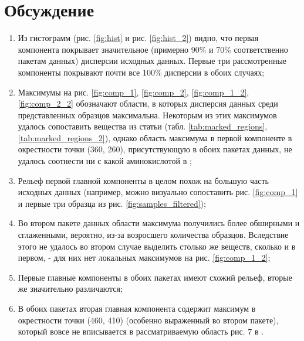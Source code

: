 \documentclass[a4paper]{article}
\begin{document}
\section{Обсуждение}
\begin{enumerate}
    \item Из гистограмм (рис. \ref{fig:hist} и рис. \ref{fig:hist_2}) видно, что первая компонента покрывает значительное (примерно 90\% и 70\% соответственно пакетам данных) дисперсии исходных данных. Первые три рассмотренные компоненты покрывают почти все 100\% дисперсии в обоих случаях;
    \item Максимумы на рис. \ref{fig:comp_1}, \ref{fig:comp_2}, \ref{fig:comp_1_2}, \ref{fig:comp_2_2} обозначают области, в которых дисперсия данных среди  представленных образцов максимальна. Некоторым из этих максимумов удалось сопоставить вещества  из статьи \cite{article1} (табл. \ref{tab:marked_regions}, \ref{tab:marked_regions_2}), однако область максимума в первой компоненте в окрестности точки (360, 260), присутствующую в обоих пакетах данных, не удалось соотнести ни с какой аминокислотой в \cite{article1};
    \item Рельеф первой главной компоненты в целом похож на большую часть исходных данных (например, можно визуально сопоставить рис. \ref{fig:comp_1} и первые три образца из рис. \ref{fig:samples_filtered});
    \item Во втором пакете данных области максимума получились более обширными и сглаженными, вероятно, из-за возросшего количества образцов. Вследствие этого не удалось во втором случае выделить столько же веществ, сколько и в первом, - для них нет локальных максимумов на рис. \ref{fig:comp_1_2};
    \item Первые главные компоненты в обоих пакетах имеют схожий рельеф, вторые же значительно различаются;
    \item В обоих пакетах вторая главная компонента содержит максимум в окрестности точки (460, 410) (особенно выраженный во втором пакете), который вовсе не вписывается в рассматриваемую область рис. 7 в \cite{article1}.
\end{enumerate}
\end{document}
